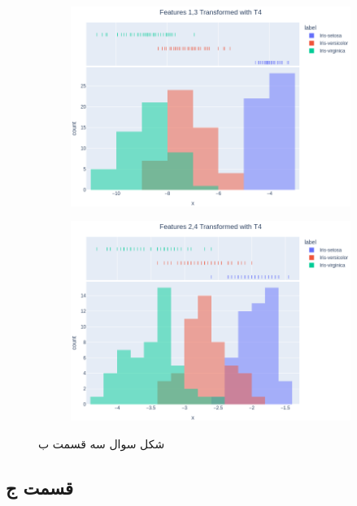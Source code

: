 \documentclass[14pt,a4]{article}
\begin{document}
\begin{figure}[h]
\begin{subfigure}{0.32\linewidth}
    \end{subfigure}
    \hfill
    \begin{subfigure}{0.32\linewidth}
        \centering
        \includegraphics[width=\linewidth]{images/q3/p2/13T4.png}
    \end{subfigure}
    \hfill
    \begin{subfigure}{0.32\linewidth}
        \centering
        \includegraphics[width=\linewidth]{images/q3/p2/24T4.png}
    \end{subfigure}
    \caption{شکل سوال سه قسمت ب}
    \label{image-for-question1-part2}
\end{figure}

\subsection*{قسمت ج}
\end{document}
